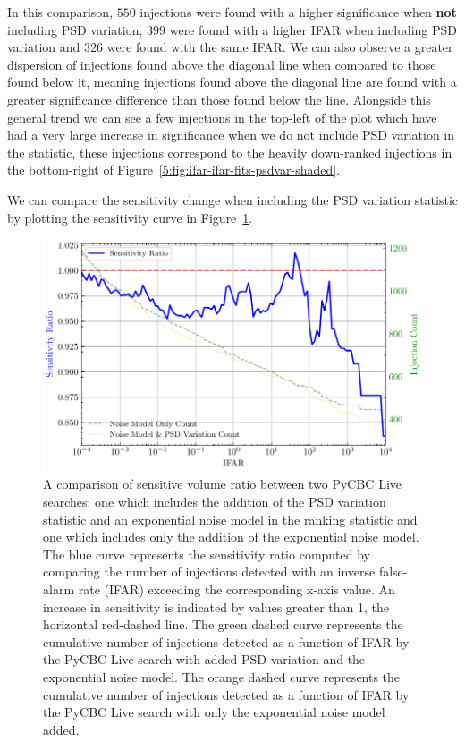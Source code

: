%
In this comparison, $550$ injections were found with a higher significance when \textbf{not} including PSD variation, $399$ were found with a higher IFAR when including PSD variation and $326$ were found with the same IFAR. We can also observe a greater dispersion of injections found above the diagonal line when compared to those found below it, meaning injections found above the diagonal line are found with a greater significance difference than those found below the line. Alongside this general trend we can see a few injections in the top-left of the plot which have had a very large increase in significance when we do not include PSD variation in the statistic, these injections correspond to the heavily down-ranked injections in the bottom-right of Figure~\ref{5:fig:ifar-ifar-fits-psdvar-shaded}.

We can compare the sensitivity change when including the PSD variation statistic by plotting the sensitivity curve in Figure~\ref{5:fig:vt-ratio-f-fo}.
%
\begin{figure}
       \centering
    \includegraphics[width=1.0\textwidth]{images/5_pycbclive/plots/fits_only_fits_psd_vt_ratio.pdf}
    \caption{A comparison of sensitive volume ratio between two PyCBC Live searches: one which includes the addition of the PSD variation statistic and an exponential noise model in the ranking statistic and one which includes only the addition of the exponential noise model. The blue curve represents the sensitivity ratio computed by comparing the number of injections detected with an inverse false-alarm rate (IFAR) exceeding the corresponding x-axis value. An increase in sensitivity is indicated by values greater than 1, the horizontal red-dashed line. The green dashed curve represents the cumulative number of injections detected as a function of IFAR by the PyCBC Live search with added PSD variation and the exponential noise model. The orange dashed curve represents the cumulative number of injections detected as a function of IFAR by the PyCBC Live search with only the exponential noise model added.}
    \label{5:fig:vt-ratio-f-fo}
\end{figure}

